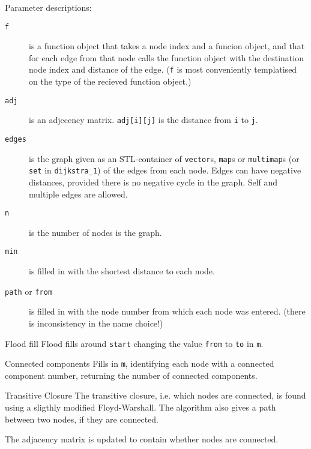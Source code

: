
Parameter descriptions:
\begin{description}
\item[{\tt f}] is a function object that takes a node index and a funcion
object, and that for each edge from that node calls the function object with
the destination node index and distance of the edge. ({\tt f} is most
conveniently templatised on the type of the recieved function object.)
\item[{\tt adj}] is an adjecency matrix. {\tt adj[i][j]} is the distance
   from {\tt i} to {\tt j}.
\item[{\tt edges}] is the graph given as an STL-container of
   {\tt vector}s, {\tt map}s or {\tt multimap}s
   (or {\tt set} in {\tt dijkstra\_1}) of the edges from each node.
   Edges can have negative distances, provided there is no negative cycle in
   the graph.
   Self and multiple edges are allowed.
\item[{\tt n}] is the number of nodes is the graph.
\item[{\tt min}] is filled in with the shortest distance to each node.
\item[{\tt path} or {\tt from}] is filled in with the node number from which
   each node was entered. (there is inconsistency in the name choice!)
\end{description}

\begin{algorithm}{Flood fill}
\desc
Flood fills around {\tt start} changing the value {\tt from} to {\tt to}
in {\tt m}.
\end{algorithm}

\begin{algorithm}{Connected components}
\desc
Fills in {\tt m}, identifying each node with a connected component number,
returning the number of connected components.
\end{algorithm}

\begin{algorithm}{Transitive Closure}
\desc
The transitive closure, i.e. which nodes are connected, is found using
a sligthly modified Floyd-Warshall. The algorithm also gives a path between
two nodes, if they are connected.

The adjacency matrix is updated to contain whether nodes are connected.
\end{algorithm}

